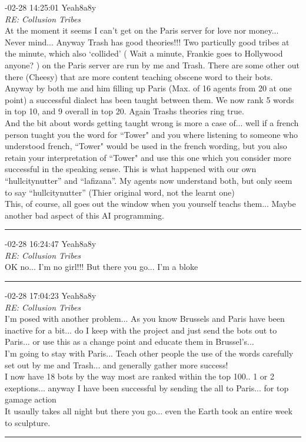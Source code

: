 \begin{mail}
{-02-28 14:25:01 Yeah8a8y}\\
{\itshape RE: Collusion Tribes}\\
At the moment it seems I can't get on the Paris server for love nor money... Never mind... Anyway Trash has good theories!!! Two particully good tribes at the minute, which also `collided' ( Wait a minute, Frankie goes to Hollywood anyone? ) on the Paris server are run by me and Trash. There are some other out there (Cheesy) that are more content teaching obscene word to their bots. Anyway by both me and him filling up Paris (Max. of 16 agents from 20 at one point) a successful dialect has been taught between them. We now rank 5 words in top 10, and 9 overall in top 20.  Again Trashs theories ring true. \\
And the bit about words getting taught wrong is more a case of... well if a french person tuaght you the word for ``Tower" and you where listening  to someone who understood french, ``Tower" would be used in the french wording, but you also retain your interpretation of ``Tower" and use this one which you consider more successful in the speaking sense. This is what happened with our own ``hullcitynutter'' and ``lafizana''. My agents now understand both, but only seem to say ``hullcitynutter''  (Thier original word, not the learnt one)\\
This, of course, all goes out the window  when you yourself teachs them... Maybe another bad aspect of this AI programming.\\

\rule{0.8\textwidth}{.4pt}

{-02-28 16:24:47 Yeah8a8y}\\
{\itshape RE: Collusion  Tribes}\\
OK no... I'm no girl!!! But there you go... I'm a bloke\\

\rule{0.8\textwidth}{.4pt}

{-02-28 17:04:23 Yeah8a8y}\\
{\itshape RE: Collusion  Tribes}\\
I'm posed with another problem... As you know Brussels and Paris have been inactive for a bit... do I keep with the project and just send the bots out to Paris... or use this as a change point and educate them in Brussel's...\\
I'm going to stay with Paris... Teach other people the use of the words carefully set out by me and Trash... and generally gather more success!\\
I now have 18 bots by the way most are ranked within the top 100.. 1 or 2 exeptions... anyway I have been successful by sending the all to Paris... for top gamage action \\
It usaully takes all night but there you go... even the Earth took an entire week to sculpture.

\rule{0.8\textwidth}{.4pt}
\end{mail}

